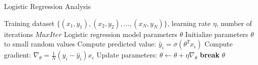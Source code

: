 \documentclass{article}
\begin{document}
	
	\begin{algorithm}
		\caption{Logistic Regression Analysis}
		\begin{algorithmic}[1]
			\Require Training dataset $\{(x_1, y_1), (x_2, y_2), \ldots, (x_N, y_N)\}$, learning rate $\eta$, number of iterations $MaxIter$
			\Ensure Logistic regression model parameters $\theta$
			\State Initialize parameters $\theta$ to small random values
			\State Compute predicted value: $\hat{y}_i = \sigma(\theta^T x_i)$
			\State Compute gradient: $\nabla_{\theta} = \frac{1}{N} (y_i - \hat{y}_i) x_i$
			\State Update parameters: $\theta \leftarrow \theta + \eta \nabla_{\theta}$
			\EndFor
			 \State \textbf{break} \EndIf
			\EndFor
			\State \Return $\theta$
		\end{algorithmic}
	\end{algorithm}
	
\end{document}
